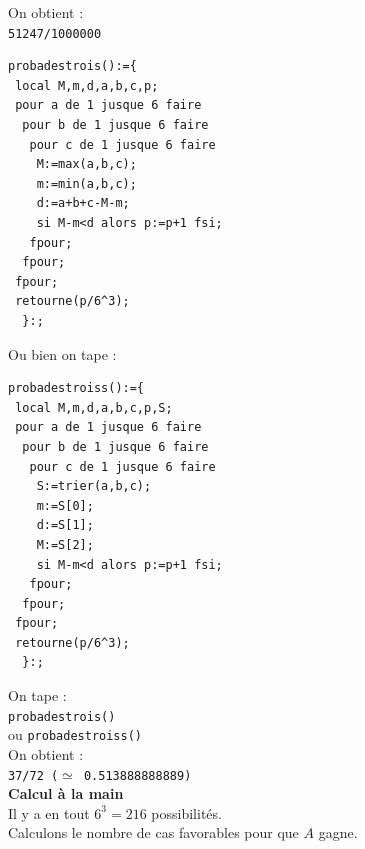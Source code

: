 \documentclass[a4paper,11pt]{book}
\begin{document}
On obtient :\\
{\tt 51247/1000000}\\
\begin{verbatim}
probadestrois():={
 local M,m,d,a,b,c,p;
 pour a de 1 jusque 6 faire 
  pour b de 1 jusque 6 faire 
   pour c de 1 jusque 6 faire 
    M:=max(a,b,c);
    m:=min(a,b,c);
    d:=a+b+c-M-m;
    si M-m<d alors p:=p+1 fsi;
   fpour;
  fpour;
 fpour;
 retourne(p/6^3);
  }:;
\end{verbatim}
Ou bien on tape :
\begin{verbatim}
probadestroiss():={
 local M,m,d,a,b,c,p,S;
 pour a de 1 jusque 6 faire 
  pour b de 1 jusque 6 faire 
   pour c de 1 jusque 6 faire 
    S:=trier(a,b,c);
    m:=S[0];
    d:=S[1];
    M:=S[2];
    si M-m<d alors p:=p+1 fsi;
   fpour;
  fpour;
 fpour;
 retourne(p/6^3);
  }:;
\end{verbatim}
On tape :\\
{\tt probadestrois()}\\
ou 
{\tt probadestroiss()}\\
On obtient :\\
{\tt 37/72 ($\simeq$ 0.513888888889)}\\
{\bf Calcul \`a la main}\\
Il y a en tout $6^3=216$ possibilit\'es.\\
Calculons le nombre de cas favorables pour que $A$ gagne.\\
\end{document}
